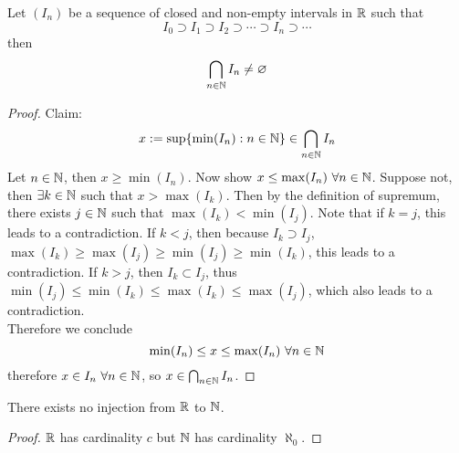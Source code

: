 \documentclass[11pt]{article}
\begin{document}
            \begin{theorem}
                Let $(I_n)$ be a sequence of closed and non-empty intervals in $\mathbb{R}$ such that
                \begin{equation}
                    I_0 \supset I_1 \supset I_2 \supset \cdots \supset I_n \supset \cdots
                \end{equation}
                then 
                \begin{equation}
                    \bigcap_{n \in \mathbb{N}} I_n \neq \varnothing
                \end{equation}
            \end{theorem}
            
            \begin{proof}
                Claim:
                \begin{equation}
                    x := \sup\{\min(I_n): n \in \mathbb{N}\} \in \bigcap_{n \in \mathbb{N}} I_n
                \end{equation}
                Let $n \in \mathbb{N}$, then $x \geq \min(I_n)$. Now show $x \leq \max(I_n)\ \forall n \in \mathbb{N}$. Suppose not, then $\exists k \in \mathbb{N}$ such that $x > \max(I_k)$. Then by the definition of supremum, there exists $j \in \mathbb{N}$ such that $\max(I_k) < \min(I_j)$. Note that if $k=j$, this leads to a contradiction. If $k < j$, then because $I_k\supset I_j$, $\max(I_k) \geq \max(I_j) \geq \min(I_j) \geq \min(I_k)$, this leads to a contradiction. If $k > j$, then $I_k \subset I_j$, thus $\min(I_j) \leq \min(I_k) \leq \max(I_k) \leq \max(I_j)$, which also leads to a contradiction.\\
                Therefore we conclude
                \begin{equation}
                    \min(I_n) \leq x \leq \max(I_n)\ \forall n \in \mathbb{N}
                \end{equation}
                therefore $x \in I_n\ \forall n \in \mathbb{N}$, so $x \in \bigcap_{n \in \mathbb{N}}I_n$.
            \end{proof}
            
            \begin{theorem}
                There exists no injection from $\mathbb{R}$ to $\mathbb{N}$.
            \end{theorem}
            
            \begin{proof}
                $\mathbb{R}$ has cardinality $c$ but $\mathbb{N}$ has cardinality $\aleph_0$.
            \end{proof}
        
\end{document}
